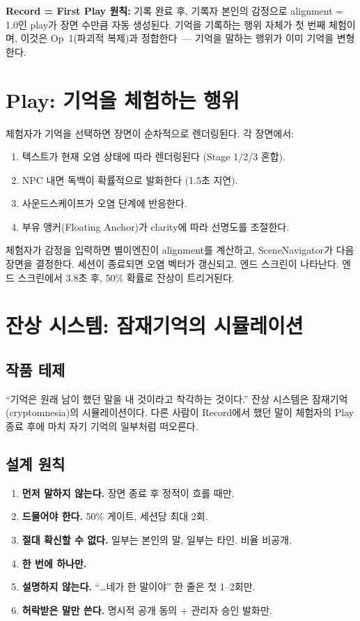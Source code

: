 \documentclass[11pt, a4paper]{article}
\begin{document}
\textbf{Record = First Play 원칙:} 기록 완료 후, 기록자 본인의 감정으로 alignment = 1.0인 play가 장면 수만큼 자동 생성된다. 기억을 기록하는 행위 자체가 첫 번째 체험이며, 이것은 Op~1(파괴적 복제)과 정합한다~--- 기억을 말하는 행위가 이미 기억을 변형한다.


\section{Play: 기억을 체험하는 행위}

체험자가 기억을 선택하면 장면이 순차적으로 렌더링된다. 각 장면에서:

\begin{enumerate}
\item 텍스트가 현재 오염 상태에 따라 렌더링된다 (Stage 1/2/3 혼합).
\item NPC 내면 독백이 확률적으로 발화한다 (1.5초 지연).
\item 사운드스케이프가 오염 단계에 반응한다.
\item 부유 앵커(Floating Anchor)가 clarity에 따라 선명도를 조절한다.
\end{enumerate}

체험자가 감정을 입력하면 별이엔진이 alignment를 계산하고, SceneNavigator가 다음 장면을 결정한다. 세션이 종료되면 오염 벡터가 갱신되고, 엔드 스크린이 나타난다. 엔드 스크린에서 3.8초 후, 50\% 확률로 잔상이 트리거된다.


\section{잔상 시스템: 잠재기억의 시뮬레이션}
\label{sec:afterimage}

\subsection{작품 테제}

``기억은 원래 남이 했던 말을 내 것이라고 착각하는 것이다.'' 잔상 시스템은 잠재기억(cryptomnesia)의 시뮬레이션이다. 다른 사람이 Record에서 했던 말이 체험자의 Play 종료 후에 마치 자기 기억의 일부처럼 떠오른다.

\subsection{설계 원칙}

\begin{enumerate}
\item \textbf{먼저 말하지 않는다.} 장면 종료 후 정적이 흐를 때만.
\item \textbf{드물어야 한다.} 50\% 게이트, 세션당 최대 2회.
\item \textbf{절대 확신할 수 없다.} 일부는 본인의 말, 일부는 타인. 비율 비공개.
\item \textbf{한 번에 하나만.}
\item \textbf{설명하지 않는다.} ``\ldots 네가 한 말이야'' 한 줄은 첫 1--2회만.
\item \textbf{허락받은 말만 쓴다.} 명시적 공개 동의 + 관리자 승인 발화만.
\end{enumerate}
\end{document}
